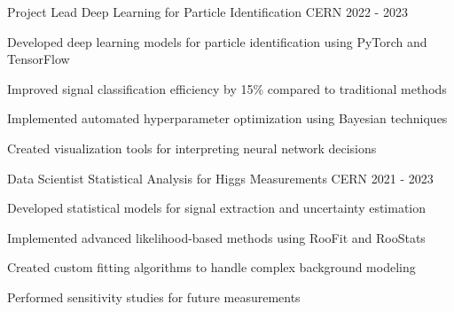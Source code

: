 


\begin{cventries}


\cventry
{Project Lead} %
{Deep Learning for Particle Identification} %
{CERN} %
{2022 - 2023} %
{ %
\begin{cvitems}
\item {Developed deep learning models for particle identification using PyTorch and TensorFlow}
\item {Improved signal classification efficiency by 15\% compared to traditional methods}
\item {Implemented automated hyperparameter optimization using Bayesian techniques}
\item {Created visualization tools for interpreting neural network decisions}
\end{cvitems}
}


\cventry
{Data Scientist} %
{Statistical Analysis for Higgs Measurements} %
{CERN} %
{2021 - 2023} %
{ %
\begin{cvitems}
\item {Developed statistical models for signal extraction and uncertainty estimation}
\item {Implemented advanced likelihood-based methods using RooFit and RooStats}
\item {Created custom fitting algorithms to handle complex background modeling}
\item {Performed sensitivity studies for future measurements}
\end{cvitems}
}



\end{cventries}

